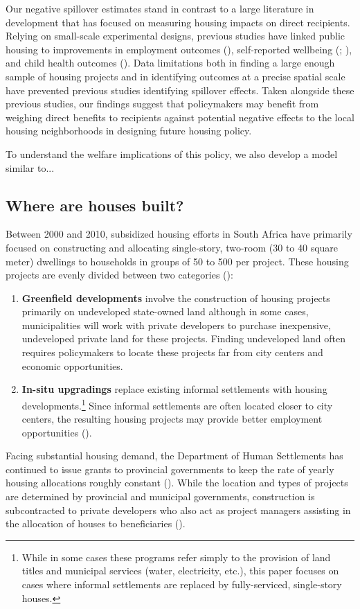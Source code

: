 \documentclass[12pt]{article}
\begin{document}
Our negative spillover estimates stand in contrast to a large literature in development that has focused on measuring housing impacts on direct recipients.  Relying on small-scale experimental designs, previous studies have linked public housing to improvements in employment outcomes (\cite{franklin2016enabled}), self-reported wellbeing (\cite{galiani2017shelter}; \cite{devoto2012happiness}), and child health outcomes (\cite{cattaneo2009housing}).  Data limitations both in finding a large enough sample of housing projects and in identifying outcomes at a precise spatial scale have prevented previous studies identifying spillover effects.  Taken alongside these previous studies, our findings suggest that policymakers may benefit from weighing direct benefits to recipients against potential negative effects to the local housing neighborhoods in designing future housing policy.

To understand the welfare implications of this policy, we also develop a model similar to... 



\subsection{Where are houses built?}

Between 2000 and 2010, subsidized housing efforts in South Africa have primarily focused on constructing and allocating single-story, two-room (30 to 40 square meter) dwellings to households in groups of 50 to 500 per project.  These housing projects are evenly divided between two categories (\cite{dhsreports}):
\begin{enumerate}
	\item  \textbf{Greenfield developments} involve the construction of housing projects primarily on undeveloped state-owned land although in some cases, municipalities will work with private developers to purchase inexpensive, undeveloped private land for these projects.  Finding undeveloped land often requires policymakers to locate these projects far from city centers and economic opportunities.  
	\item  \textbf{In-situ upgradings} replace existing informal settlements with housing developments.\footnote{While in some cases these programs refer simply to the provision of land titles and municipal services (water, electricity, etc.), this paper focuses on cases where informal settlements are replaced by fully-serviced, single-story houses.}  Since informal settlements are often located closer to city centers, the resulting housing projects may provide better employment opportunities (\cite{serihistory}).
\end{enumerate}
Facing substantial housing demand, the Department of Human Settlements has continued to issue grants to provincial governments to keep the rate of yearly housing allocations roughly constant (\cite{dhsreports}).  While the location and types of projects are determined by provincial and municipal governments, construction is subcontracted to private developers who also act as project managers assisting in the allocation of houses to beneficiaries (\cite{seriq}).
\end{document}
